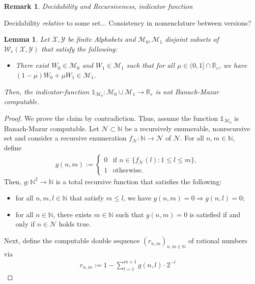 \documentclass[conference]{IEEEtran}
\def\X{{\mathcal X}}
\def\Y{{\mathcal Y}}
\def\M{{\mathcal M}}
\def\N{{\mathcal N}}
\def\W{{\mathcal W}}
\def\NN{{\mathbb N}}
\def\RR{{\mathbb R}}
\newcommand{\RRc}{\RR_{\mathrm{c}}}
\newcommand{\Wc}{\W_{\mathrm{c}}}
\newtheorem{Lemma}[Theorem]{Lemma}
\newtheorem{Remark}[Theorem]{Remark}
\begin{document}
	{\color{red} 
	\begin{Remark} Decidability and Recursiveness, indicator function\end{Remark}}
	
	{\color{red} Decidability \emph{relative} to some set... Consistency in nomenclature between versions?}
	
	\begin{Lemma}	\label{lem:IndicatorFunctionBanachMazur}
					Let \(\X,\Y\) be finite Alphabets and \(\M_0, \M_1\) disjoint subsets of \(\Wc(\X,\Y)\) that satisfy the following:
					\begin{itemize}	\item There exist \(W_0\in\M_0\) and \(W_1\in\M_1\) such that for all \(\mu \in (0,1]\cap \RRc\), 													
										we have \((1-\mu)W_0 + \mu W_1 \in \M_1\). 
					\end{itemize}
					Then, the indicator-function \(\mathds{1}_{\M_0} : \M_0\cup \M_1 \rightarrow \RRc\) is \emph{not} Banach-Mazur computable.
	\end{Lemma}\begin{proof}
					We prove the claim by contradiction. Thus, assume the function \(\mathds{1}_{\M_0}\) is Banach-Mazur computable. Let 
					\(\N\subset \NN\) be a recursively enumerable, nonrecursive set and consider a recursive enumeration \(f_\N : \NN \rightarrow \N\)
					of \(\N\). For all \(n,m\in\NN\), define
					\begin{align}	g(n,m) := 	\begin{cases}	0 &\text{if~} n \in \big\{f_\N(l) : 1 \leq l \leq m\big\}, \\ 	
																1 &\text{otherwise}.
												\end{cases}
					\end{align}
					Then, \(g: \NN^2 \rightarrow \NN\) is a total recursive function that satisfies the following:
					\begin{itemize}	\item 	for all \(n,m,l\in\NN\) that satisfy \(m\leq l\), we have \linebreak \(g(n,m) = 0 \Rightarrow g(n,l) = 0\);
									\item	for all \(n\in\NN\), there exists \(m\in\NN\) such that \(g(n,m) = 0\) is satisfied if and only if 
											\(n\in \N\) holds true.
					\end{itemize}
					Next, define the computable double sequence \((r_{n,m})_{n,m\in\NN}\) of rational numbers via
					\begin{align}	r_{n,m} := 1 - \sum_{l = 1}^{m+1} g(n,l)\cdot 2^{-l}

\end{align}
\end{proof}
\end{document}
